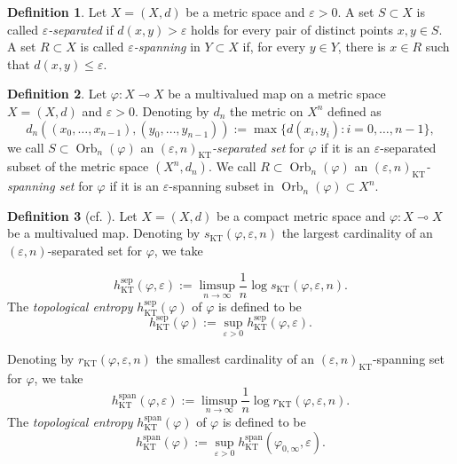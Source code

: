 \documentclass[12pt]{amsart}
\theoremstyle{definition}
\newtheorem{definition}{Definition}
\newcommand{\vp}{\varphi}
\newcommand{\ep}{{\varepsilon}}
\newcommand{\spa}{\operatorname{span}}
\newcommand{\sepp}{\operatorname{sep}}
\newcommand{\orbn}{{\operatorname{Orb}_n}}
\newcommand{\KT}{\operatorname{KT}}
\newcommand{\hKT}{h_{\KT}}
\begin{document}
\begin{definition}\label{d:5}
Let $X=(X,d)$ be a metric space and $\ep>0$. A set $S\subset X$ is called \emph{$\ep$-separated} if $d(x,y)>\ep$ holds for every pair of distinct points $x,y\in S$. A set $R\subset X$ is called \emph{$\ep$-spanning} in $Y\subset X$ if, for every $y\in Y$, there is $x\in R$ such that $d(x,y)\leq\ep$.
\end{definition}

\begin{definition}\label{d:6}
Let $\vp:X\multimap X$ be a multivalued map on a metric space $X=(X,d)$ and $\ep>0$. Denoting by $d_n$ the metric on $X^n$ defined as
\[
d_n((x_0,\ldots,x_{n-1}),(y_0,\ldots,y_{n-1})):=\max\{d(x_i,y_i):i=0,\ldots,n-1\},
\]
we call $S\subset\orbn(\vp)$ an \emph{$(\ep,n)_{\KT}$-separated set} for $\vp$ if it is an $\ep$-separated subset of the metric space $(X^n,d_n)$. We call $R\subset\orbn(\vp)$ an \emph{$(\ep,n)_{\KT}$-spanning set} for $\vp$ if it is an $\ep$-spanning subset in $\orbn(\vp)\subset X^n$.
\end{definition}

\begin{definition}[cf. \cite{KT}]\label{d:7}
Let $X=(X,d)$ be a compact metric space and $\vp:X\multimap X$ be a multivalued map. Denoting by $s_{\KT}(\vp,\ep,n)$ the largest cardinality of an $(\ep,n)$-separated set for $\vp$, we take

\begin{equation*}
\hKT^{\sepp}(\vp,\ep) := \limsup_{n\to\infty} \frac1{n}\log s_{\KT}(\vp,\ep,n).
\end{equation*}
The \emph{topological entropy} $\hKT^{\sepp}(\vp)$ of $\vp$ is defined to be
\begin{equation*}
\hKT^{\sepp}(\vp):= \sup_{\ep>0} \hKT^{\sepp}(\vp,\ep).
\end{equation*}

Denoting by $r_{\KT}(\vp,\ep,n)$ the smallest cardinality of an $(\ep,n)_{\KT}$-spanning set for $\vp$, we take
\begin{equation*}
\hKT^{\spa}(\vp,\ep) := \limsup_{n\to\infty} \frac1{n}\log r_{\KT}(\vp,\ep,n).
\end{equation*}
The \emph{topological entropy} $\hKT^{\spa}(\vp)$ of $\vp$ is defined to be
\begin{equation*}
\hKT^{\spa}(\vp):= \sup_{\ep>0} \hKT^{\spa}(\vp_{0,\infty},\ep).
\end{equation*}
\end{definition}
\end{document}
